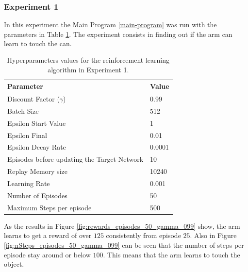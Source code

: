 \documentclass[12pt,oneside]{article}
\begin{document}
\subsubsection{Experiment 1}\label{experiment:experiment-1}
In this experiment the Main Program \ref{main-program} was run with the parameters in Table \ref{tab:hyperparams-exp-1}. The experiment consists in finding out if the arm can learn to touch the can.
\begin{table}[h]
\centering
\begin{tabular}{l l}
\hline
Parameter & Value \\
\hline
Discount Factor ($\gamma$) & 0.99 \\
Batch Size & 512 \\
Epsilon Start Value & 1 \\
Epsilon Final & 0.01 \\
Epsilon Decay Rate & 0.0001 \\
Episodes before updating the Target Network & 10 \\
Replay Memory size & 10240 \\
Learning Rate & 0.001 \\
Number of Episodes & 50 \\
Maximum Steps per episode & 500 \\
\hline
\end{tabular}
\caption{Hyperparameters values for the reinforcement learning algorithm in Experiment 1.}
\label{tab:hyperparams-exp-1}
\end{table}

As the results in Figure \ref{fig:rewards_episodes_50_gamma_099} show, the arm learns to get a reward of over $125$ consistently from episode $25$. Also in Figure \ref{fig:nSteps_episodes_50_gamma_099} can be seen that the number of steps per episode stay around or below $100$. This means that the arm learns to touch the object.
\end{document}

